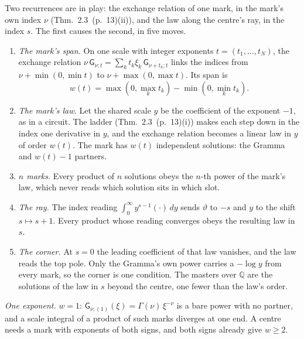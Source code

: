 \documentclass[11pt]{article}
\newcommand{\sG}{\mathsf G}
\newcommand{\hb}[2]{#1~(p.~#2)}   %
\theoremstyle{plain}
\theoremstyle{remark}
\begin{document}
Two recurrences are in play: the exchange relation of one mark, in the mark's own index $\nu$ (Thm.~\hb{2.3}{13}(ii)), and the law along the centre's ray, in the index $s$. The first causes the second, in five moves.
\begin{enumerate}[label=(\roman*)]
\item \emph{The mark's span.} On one scale with integer exponents $t=(t_1,\dots,t_N)$, the exchange relation $\nu\,\sG_{\nu;t}=\sum_kt_k\xi_k\,\sG_{\nu+t_k;t}$ links the indices from $\nu+\min(0,\min t)$ to $\nu+\max(0,\max t)$. Its span is
\[
w(t)=\max(0,\max_kt_k)-\min(0,\min_kt_k).
\]
\item \emph{The mark's law.} Let the shared scale $y$ be the coefficient of the exponent $-1$, as in a circuit. The ladder (Thm.~\hb{2.3}{13}(i)) makes each step down in the index one derivative in $y$, and the exchange relation becomes a linear law in $y$ of order $w(t)$. The mark has $w(t)$ independent solutions: the Gramma and $w(t)-1$ partners.
\item \emph{$n$ marks.} Every product of $n$ solutions obeys the $n$-th power of the mark's law, which never reads which solution sits in which slot.
\item \emph{The ray.} The index reading $\int_0^\infty y^{s-1}(\cdot)\,dy$ sends $\vartheta$ to $-s$ and $y$ to the shift $s\mapsto s+1$. Every product whose reading converges obeys the resulting law in $s$.
\item \emph{The corner.} At $s=0$ the leading coefficient of that law vanishes, and the law reads the top pole. Only the Gramma's own power carries a $-\log y$ from every mark, so the corner is one condition. The masters over $\mathbb Q$ are the solutions of the law in $s$ beyond the centre, one fewer than the law's order.
\end{enumerate}

\emph{One exponent.} $w=1$: $\sG_{\nu;(1)}(\xi)=\Gamma(\nu)\,\xi^{-\nu}$ is a bare power with no partner, and a scale integral of a product of such marks diverges at one end. A centre needs a mark with exponents of both signs, and both signs already give $w\ge2$.
\end{document}
